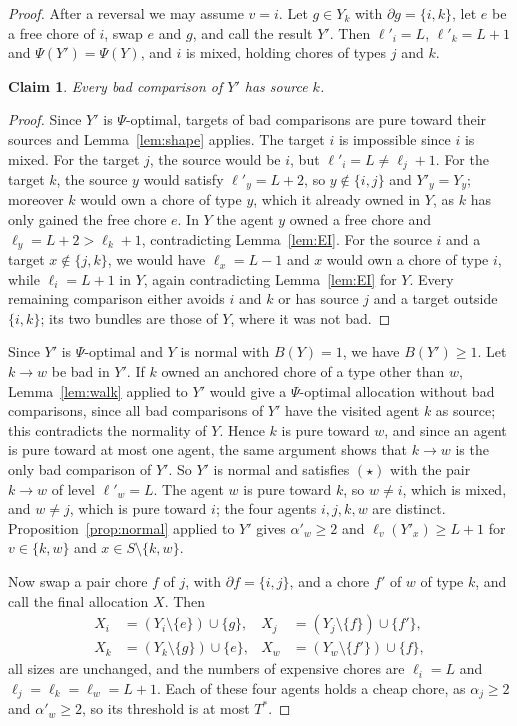 \documentclass{amsart}
\numberwithin{equation}{section}
\newtheorem{claim}{Claim}
\theoremstyle{definition}
\theoremstyle{remark}
\newcommand{\bd}{\partial}
\begin{document}
\begin{proof}
After a reversal we may assume $v=i$. Let $g\in Y_k$ with $\bd g=\{i,k\}$, let $e$ be a free chore of $i$, swap $e$ and $g$, and call the result $Y'$. Then $\ell'_i=L$, $\ell'_k=L+1$ and $\Psi(Y')=\Psi(Y)$, and $i$ is mixed, holding chores of types $j$ and $k$.

\begin{claim}\label{cl:neutral1}
Every bad comparison of $Y'$ has source $k$.
\end{claim}

\begin{proof}
Since $Y'$ is $\Psi$-optimal, targets of bad comparisons are pure toward their sources and Lemma~\ref{lem:shape} applies. The target $i$ is impossible since $i$ is mixed. For the target $j$, the source would be $i$, but $\ell'_i=L\ne\ell_j+1$. For the target $k$, the source $y$ would satisfy $\ell'_y=L+2$, so $y\notin\{i,j\}$ and $Y'_y=Y_y$; moreover $k$ would own a chore of type $y$, which it already owned in $Y$, as $k$ has only gained the free chore $e$. In $Y$ the agent $y$ owned a free chore and $\ell_y=L+2>\ell_k+1$, contradicting Lemma~\ref{lem:EI}. For the source $i$ and a target $x\notin\{j,k\}$, we would have $\ell_x=L-1$ and $x$ would own a chore of type $i$, while $\ell_i=L+1$ in $Y$, again contradicting Lemma~\ref{lem:EI} for $Y$. Every remaining comparison either avoids $i$ and $k$ or has source $j$ and a target outside $\{i,k\}$; its two bundles are those of $Y$, where it was not bad.
\end{proof}

Since $Y'$ is $\Psi$-optimal and $Y$ is normal with $B(Y)=1$, we have $B(Y')\ge1$. Let $k\to w$ be bad in $Y'$. If $k$ owned an anchored chore of a type other than $w$, Lemma~\ref{lem:walk} applied to $Y'$ would give a $\Psi$-optimal allocation without bad comparisons, since all bad comparisons of $Y'$ have the visited agent $k$ as source; this contradicts the normality of $Y$. Hence $k$ is pure toward $w$, and since an agent is pure toward at most one agent, the same argument shows that $k\to w$ is the only bad comparison of $Y'$. So $Y'$ is normal and satisfies $(\star)$ with the pair $k\to w$ of level $\ell'_w=L$. The agent $w$ is pure toward $k$, so $w\ne i$, which is mixed, and $w\ne j$, which is pure toward $i$; the four agents $i,j,k,w$ are distinct. Proposition~\ref{prop:normal} applied to $Y'$ gives $\alpha'_w\ge2$ and $\ell_v(Y'_x)\ge L+1$ for $v\in\{k,w\}$ and $x\in S\setminus\{k,w\}$.

Now swap a pair chore $f$ of $j$, with $\bd f=\{i,j\}$, and a chore $f'$ of $w$ of type $k$, and call the final allocation $X$. Then
\begin{align*}
X_i&=(Y_i\setminus\{e\})\cup\{g\}, & X_j&=(Y_j\setminus\{f\})\cup\{f'\},\\
X_k&=(Y_k\setminus\{g\})\cup\{e\}, & X_w&=(Y_w\setminus\{f'\})\cup\{f\},
\end{align*}
all sizes are unchanged, and the numbers of expensive chores are $\ell_i=L$ and $\ell_j=\ell_k=\ell_w=L+1$. Each of these four agents holds a cheap chore, as $\alpha_j\ge2$ and $\alpha'_w\ge2$, so its threshold is at most $T^*$.


\end{proof}
\end{document}

